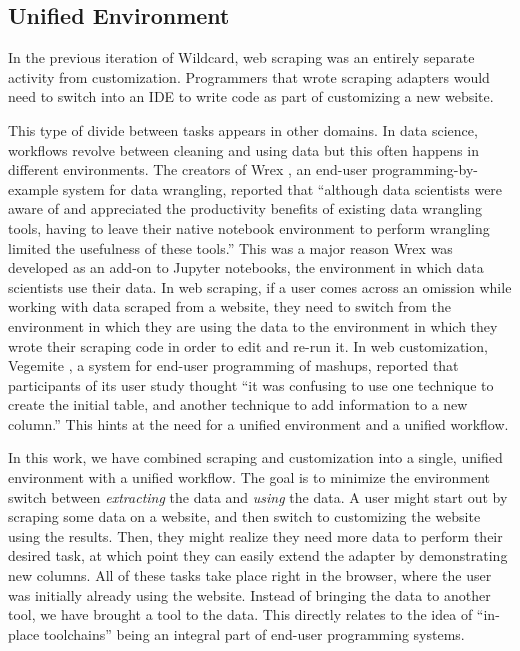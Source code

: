 \documentclass[sigconf,10pt]{acmart}
\begin{document}
\hypertarget{unified-environment}{%
\subsection{Unified Environment}\label{unified-environment}}

In the previous iteration of Wildcard, web scraping was an entirely
separate activity from customization. Programmers that wrote scraping
adapters would need to switch into an IDE to write code as part of
customizing a new website.

This type of divide between tasks appears in other domains. In data
science, workflows revolve between cleaning and using data but this
often happens in different environments. The creators of Wrex
\citep{drosos2020}, an end-user programming-by-example system for data
wrangling, reported that ``although data scientists were aware of and
appreciated the productivity benefits of existing data wrangling tools,
having to leave their native notebook environment to perform wrangling
limited the usefulness of these tools.'' This was a major reason Wrex
was developed as an add-on to Jupyter notebooks, the environment in
which data scientists use their data. In web scraping, if a user comes
across an omission while working with data scraped from a website, they
need to switch from the environment in which they are using the data to
the environment in which they wrote their scraping code in order to edit
and re-run it. In web customization, Vegemite \citep{lin2009}, a system
for end-user programming of mashups, reported that participants of its
user study thought ``it was confusing to use one technique to create the
initial table, and another technique to add information to a new
column.'' This hints at the need for a unified environment and a unified
workflow.

In this work, we have combined scraping and customization into a single,
unified environment with a unified workflow. The goal is to minimize the
environment switch between \emph{extracting} the data and \emph{using}
the data. A user might start out by scraping some data on a website, and
then switch to customizing the website using the results. Then, they
might realize they need more data to perform their desired task, at
which point they can easily extend the adapter by demonstrating new
columns. All of these tasks take place right in the browser, where the
user was initially already using the website. Instead of bringing the
data to another tool, we have brought a tool to the data. This directly
relates to the idea of ``in-place toolchains'' \citep{zotero-60} being
an integral part of end-user programming systems.
\end{document}
